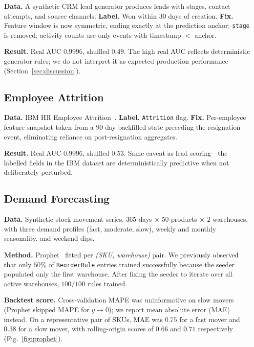 \documentclass[conference]{IEEEtran}
\begin{document}
\textbf{Data.} A synthetic CRM lead generator produces leads with stages,
contact attempts, and source channels. \textbf{Label.} Won within $30$ days
of creation. \textbf{Fix.} Feature window is now symmetric, ending exactly at
the prediction anchor; \texttt{stage} is removed; activity counts use only
events with timestamp $<$ anchor.

\textbf{Result.} Real AUC $0.9996$, shuffled $0.49$. The high real AUC
reflects deterministic generator rules; we do not interpret it as expected
production performance (Section~\ref{sec:discussion}).

\subsection{Employee Attrition}

\textbf{Data.} IBM HR Employee Attrition~\cite{ibm2017hr}.
\textbf{Label.} \texttt{Attrition} flag.
\textbf{Fix.} Per-employee feature snapshot taken from a $90$-day backfilled
state preceding the resignation event, eliminating reliance on
post-resignation aggregates.

\textbf{Result.} Real AUC $0.9996$, shuffled $0.53$. Same caveat as lead
scoring---the labelled fields in the IBM dataset are deterministically
predictive when not deliberately perturbed.

\subsection{Demand Forecasting}

\textbf{Data.} Synthetic stock-movement series, $365$ days $\times$ $50$
products $\times$ $2$ warehouses, with three demand profiles (fast, moderate,
slow), weekly and monthly seasonality, and weekend dips.

\textbf{Method.} Prophet~\cite{taylor2018forecasting} fitted per
\textit{(SKU, warehouse)} pair. We previously observed that only $50\%$ of
\texttt{ReorderRule} entries trained successfully because the seeder
populated only the first warehouse. After fixing the seeder to iterate over
all active warehouses, $100/100$ rules trained.

\textbf{Backtest score.} Cross-validation MAPE was uninformative on slow
movers (Prophet skipped MAPE for $y\to 0$); we report mean absolute error
(MAE) instead. On a representative pair of SKUs, MAE was $0.75$ for a fast
mover and $0.38$ for a slow mover, with rolling-origin scores of $0.66$ and
$0.71$ respectively (Fig.~\ref{fig:prophet}).
\end{document}
